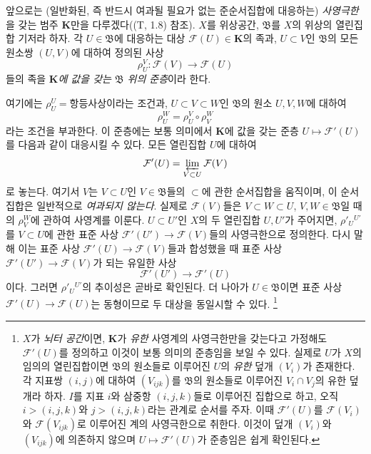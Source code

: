 \begin{env}[3.2.1]
\label{0.3.2.1-ko}
앞으로는 (일반화된, 즉 반드시 여과될 필요가 없는 준순서집합에 대응하는) \emph{사영극한}을 갖는 범주 $\mathbf K$만을 다루겠다((T, 1.8) 참조). $X$를 위상공간, $\mathfrak B$를 $X$의 위상의 열린집합 기저라 하자. 각 $U\in\mathfrak B$에 대응하는 대상 $\mathcal F(U)\in\mathbf K$의 족과, $U\subset V$인 $\mathfrak B$의 모든 원소쌍 $(U,V)$에 대하여 정의된 사상
\[
  \rho_U^V:\mathcal F(V)\longrightarrow\mathcal F(U)
\]
들의 족을 \emph{$\mathbf K$에 값을 갖는 $\mathfrak B$ 위의 준층}이라 한다.


여기에는 $\rho_U^U=\text{항등사상}$이라는 조건과, $U\subset V\subset W$인 $\mathfrak B$의 원소 $U,V,W$에 대하여
\[
  \rho_U^W=\rho_U^V\circ\rho_V^W
\]
라는 조건을 부과한다. 이 준층에는 보통 의미에서 $\mathbf K$에 값을 갖는 준층 $U\mapsto\mathcal F'(U)$를 다음과 같이 대응시킬 수 있다. 모든 열린집합 $U$에 대하여
\[
  \mathcal F'(U)=\varprojlim_{V\subset U}\mathcal F(V)
\]
로 놓는다. 여기서 $V$는 $V\subset U$인 $V\in\mathfrak B$들의 $\subset$에 관한 순서집합을 움직이며, 이 순서집합은 일반적으로 \emph{여과되지 않는다}. 실제로 $\mathcal F(V)$들은 $V\subset W\subset U$, $V,W\in\mathfrak B$일 때의 $\rho_V^W$에 관하여 사영계를 이룬다. $U\subset U'$인 $X$의 두 열린집합 $U,U'$가 주어지면, $\rho'_U{}^{U'}$를 $V\subset U$에 관한 표준 사상 $\mathcal F'(U')\to\mathcal F(V)$들의 사영극한으로 정의한다. 다시 말해 이는 표준 사상 $\mathcal F'(U)\to\mathcal F(V)$들과 합성했을 때 표준 사상 $\mathcal F'(U')\to\mathcal F(V)$가 되는 유일한 사상
\[
  \mathcal F'(U')\longrightarrow\mathcal F'(U)
\]
이다. 그러면 $\rho'_U{}^{U'}$의 추이성은 곧바로 확인된다. 더 나아가 $U\in\mathfrak B$이면 표준 사상 $\mathcal F'(U)\to\mathcal F(U)$는 동형이므로 두 대상을 동일시할 수 있다.%
\footnote{$X$가 \emph{뇌터 공간}이면, $\mathbf K$가 \emph{유한} 사영계의 사영극한만을 갖는다고 가정해도 $\mathcal F'(U)$를 정의하고 이것이 보통 의미의 준층임을 보일 수 있다. 실제로 $U$가 $X$의 임의의 열린집합이면 $\mathfrak B$의 원소들로 이루어진 $U$의 \emph{유한} 덮개 $(V_i)$가 존재한다. 각 지표쌍 $(i,j)$에 대하여 $(V_{ijk})$를 $\mathfrak B$의 원소들로 이루어진 $V_i\cap V_j$의 유한 덮개라 하자. $I$를 지표 $i$와 삼중항 $(i,j,k)$들로 이루어진 집합으로 하고, 오직 $i>(i,j,k)$와 $j>(i,j,k)$라는 관계로 순서를 주자. 이때 $\mathcal F'(U)$를 $\mathcal F(V_i)$와 $\mathcal F(V_{ijk})$로 이루어진 계의 사영극한으로 취한다. 이것이 덮개 $(V_i)$와 $(V_{ijk})$에 의존하지 않으며 $U\mapsto\mathcal F'(U)$가 준층임은 쉽게 확인된다.}
\end{env}

